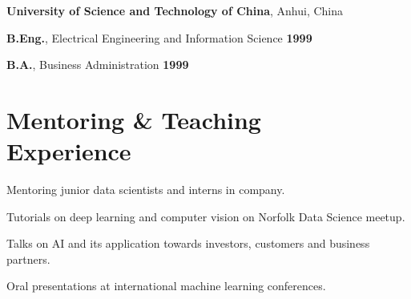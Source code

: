 \documentclass[margin,line]{resume}
\begin{document}
\begin{resume}
    \textbf{University of Science and Technology of China}, Anhui, China  \\
    \vspace{-3mm}
        \begin{list2}
        \item \textbf{B.Eng.},  Electrical Engineering and Information Science \hfill \textbf{1999}
        \item \textbf{B.A.},  Business Administration \hfill \textbf{1999}
    \end{list2}

    
    
    \section{\mysidestyle Mentoring \& Teaching\\Experience}
         \begin{list2}
			\item  Mentoring junior data scientists and interns in company.
			\item  Tutorials on deep learning and computer vision on Norfolk Data Science meetup.
			\item  Talks on AI and its application towards investors, customers and business partners. 
			\item  Oral presentations at international machine learning conferences.


\end{list2}
\end{resume}
\end{document}
